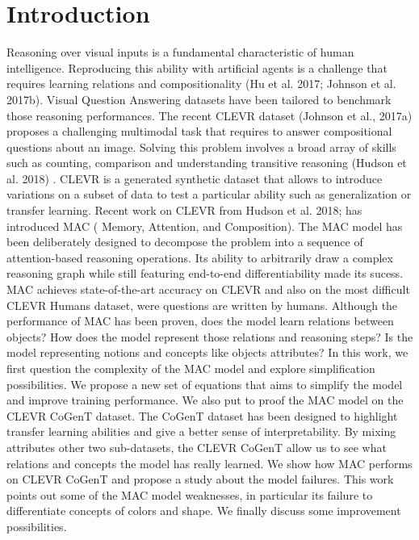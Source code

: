 \section{Introduction}
Reasoning over visual inputs is a fundamental characteristic of human intelligence.
Reproducing this ability with artificial agents is a challenge that requires learning relations and compositionality (Hu et al. 2017; Johnson et al. 2017b).
Visual Question Answering datasets have been tailored to benchmark those reasoning performances. The recent CLEVR dataset (Johnson et al., 2017a) proposes a challenging multimodal task that requires to answer compositional questions about an image. Solving this problem involves a broad array of skills such as counting, comparison and understanding transitive reasoning (Hudson et al. 2018) . CLEVR is a generated synthetic dataset that allows to introduce variations on a subset of data to test a particular ability such as generalization or transfer learning.
Recent work on CLEVR from Hudson et al. 2018;  has introduced  MAC ( Memory, Attention, and Composition). The MAC model has been deliberately designed to decompose the problem into a sequence of attention-based reasoning operations. Its ability to arbitrarily draw a complex reasoning graph while still featuring end-to-end differentiability made its sucess. 
MAC achieves state-of-the-art accuracy on CLEVR and also on the most difficult CLEVR Humans dataset, were questions are written by humans. Although the performance of MAC has been proven, does the model learn relations between objects? How does the model represent those relations and reasoning steps? 
Is the model representing notions and concepts like objects attributes? 
In this work, we first question the complexity of the MAC model and explore simplification possibilities. We propose a new set of equations that aims to simplify the model and improve training performance. 
We also put to proof the MAC model on the CLEVR CoGenT dataset. The CoGenT dataset has been designed to highlight transfer learning abilities and give a better sense of interpretability. By mixing attributes other two sub-datasets, the CLEVR CoGenT allow us to see what relations and concepts the model has really learned. We show how MAC performs on CLEVR CoGenT
and propose a study about the model failures. This work points out some of the MAC model weaknesses, in particular its failure to differentiate concepts of colors and shape. We finally discuss some improvement possibilities.
